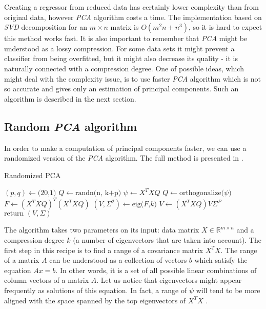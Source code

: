 Creating a regressor from reduced data has certainly lower complexity than from original data, however \textit{PCA} algorithm costs a time. The implementation based on \textit{SVD} decomposition for an $m\times{n}$ matrix is $O(m^2n + n^3)$, so it is hard to expect this method works fast. It is also important to remember that \textit{PCA} might be understood as a lossy compression. For some data sets it might prevent a classifier from being overfitted, but it might also decrease its quality - it is naturally connected with a compression degree. 
One of possible ideas, which might deal with the complexity issue, is to use faster \textit{PCA} algorithm which is not so accurate and gives only an estimation of principal components. Such an algorithm is described in the next section.

\subsection{Random \textit{PCA} algorithm}

In order to make a computation of principal components faster, we can use a randomized version of the \textit{PCA} algorithm. The full method is presented in . 

\begin{algorithm}
    \caption{Randomized PCA}\label{alg:rpca1}
    \begin{algorithmic}[1]
        \State $(p,q) \leftarrow \text{(20,1)}$
        \State $Q \leftarrow \text{randn(n, k+p)}$
            \State $\psi \leftarrow X^TXQ$
            \State $Q \leftarrow \text{orthogonalize($\psi$)}$
            \EndFor
            \State $F \leftarrow (X^TXQ)^T(X^TXQ)$
            \State $(V,\Sigma^2) \leftarrow \text{eig($F$,$k$)}$
            \State $V \leftarrow (X^TXQ)V\Sigma^P$
            \State $\text{return } (V, \Sigma)$
        \EndFunction
    \end{algorithmic}
\end{algorithm}

The algorithm takes two parameters on its input: data matrix $X \in \mathbb{R}^{m \times n}$ and a compression degree $k$ (a number of eigenvectors that are taken into account). The first step in this recipe is to find a range of a covariance matrix $X^TX$. The range of a matrix $A$ can be understood as a collection of vectors $b$ which satisfy the equation $Ax=b$. In other words, it is a set of all possible linear combinations of column vectors of a matrix $A$.  Let us notice that eigenvectors might appear frequently as solutions of this equation. In fact, a range of $\psi$ will tend to be more aligned with the space spanned by the top eigenvectors of $X^TX$ \cite{Mineiro}. 

